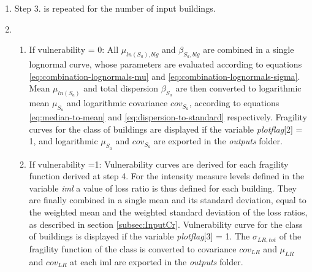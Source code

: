 \begin{enumerate}
\item Step 3. is repeated for the number of input buildings.

\item
\begin{enumerate}
\item If vulnerability = 0: All $\mu_{ln(S_a), blg}$ and $\beta_{S_a, blg}$ are combined in a single lognormal curve, whose parameters are evaluated according to equations \ref{eq:combination-lognormals-mu} and \ref{eq:combination-lognormals-sigma}. Mean $\mu_{ln(S_{a})}$ and total dispersion $\beta_{S_a}$ are then converted to logarithmic mean $\mu_{S_a}$ and logarithmic covariance $cov_{S_a}$, according to equations \ref{eq:median-to-mean} and \ref{eq:dispersion-to-standard} respectively. Fragility curves for the class of buildings are displayed if the variable \textit{plotflag}[2] = 1, and logarithmic $\mu_{S_a}$ and $cov_{S_a}$ are exported in the \textit{outputs} folder.

\item If vulnerability =1: Vulnerability curves are derived for each fragility function derived at step 4. For the intensity measure levels defined in the variable \textit{iml} a value of loss ratio is thus defined for each building. They are finally combined in a single mean and its standard deviation, equal to the weighted mean and the weighted standard deviation of the loss ratios, as described in section \ref{subsec:InputCr}. Vulnerability curve for the class of buildings is displayed if the variable \textit{plotflag}[3] = 1. The $\sigma_{LR, tot}$ of the fragility function of the class is converted to covariance $cov_{LR}$ and $\mu_{LR}$ and $cov_{LR}$ at each iml are exported in the \textit{outputs} folder.
\end{enumerate}
\end{enumerate}
